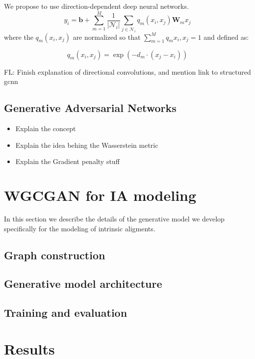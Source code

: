 \documentclass[a4paper,fleqn,usenatbib]{mnras}
\newcommand{\fl}[1]{{\color{magenta}FL: #1}}
\begin{document}
We propose to use  direction-dependent  deep neural networks.
\begin{equation}
	y_i=  \mathbf{b} +  \sum\limits_{m=1}^{M} \frac{1}{|\mathcal{N}_i|} \sum_{j \in \mathcal{N}_i} q_m(x_i, x_j) \mathbf{W}_m x_j 
\end{equation}
where the  $q_m(x_i, x_j)$ are normalized so that $\sum_{m=1}^{M} q_m{x_i, x_j} = 1$ and defined as:

\begin{equation}
		q_m(x_i, x_j) = \exp(- d_m \cdot (x_j - x_i))
\end{equation}

\fl{Finish explanation of directional convolutions, and mention link to structured gcnn}


\subsection{Generative Adversarial Networks}

\begin{itemize}
	\item Explain the concept
	\item Explain the idea behing the Wasserstein metric
	\item Explain  the  Gradient penalty stuff
\end{itemize}


\section{WGCGAN for IA modeling}

In this section we describe the details of the generative model we develop specifically for the modeling of 
intrinsic aligments.




\subsection{Graph construction}


\subsection{Generative model architecture}


\subsection{Training and evaluation}

\section{Results}
\end{document}
